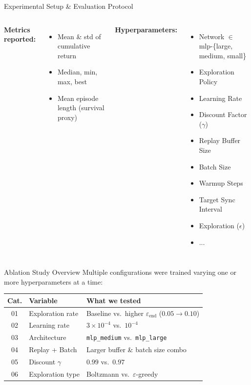 \documentclass[aspectratio=169]{beamer}
\begin{document}
\begin{frame}{Experimental Setup \& Evaluation Protocol}
  \begin{columns}[c]

      \vspace{0.5em}
      \textbf{Metrics reported:}
      \begin{itemize}
        \item Mean \& std of cumulative return
        \item Median, min, max, best
        \item Mean episode length (survival proxy)
      \end{itemize}

      \textbf{Hyperparameters:}
      \begin{itemize}
          \item Network $\in$ mlp-\{large, medium, small\}
          \item Exploration Policy
          \item Learning Rate
          \item Discount Factor ($\gamma$)
          \item Replay Buffer Size
          \item Batch Size
          \item Warmup Steps
          \item Target Sync Interval
          \item Exploration ($\epsilon$)
          \item ...
      \end{itemize}
  \end{columns}
\end{frame}

\begin{frame}{Ablation Study Overview}
  Multiple configurations were trained varying one or more hyperparameters at a time:

  \vspace{0.6em}
  \begin{center}
    \begin{tabular}{clp{5.5cm}}
      \toprule
      \textbf{Cat.} & \textbf{Variable} & \textbf{What we tested} \\
      \midrule
      01 & Exploration rate & Baseline vs.\ higher $\varepsilon_{\text{end}}$ ($0.05 \to 0.10$) \\
      02 & Learning rate    & $3{\times}10^{-4}$ vs.\ $10^{-4}$ \\
      03 & Architecture     & \texttt{mlp\_medium} vs.\ \texttt{mlp\_large} \\
      04 & Replay + Batch   & Larger buffer \& batch size combo \\
      05 & Discount $\gamma$ & $0.99$ vs.\ $0.97$ \\
      06 & Exploration type & Boltzmann vs.\ $\varepsilon$-greedy \\
      \bottomrule
    \end{tabular}
  \end{center}
\end{frame}
\end{document}
